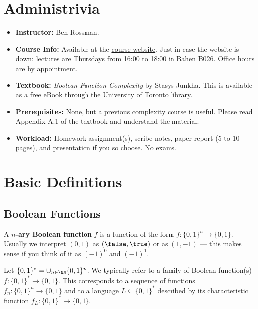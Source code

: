 
\section{Administrivia}
\label{sec:admin}
\begin{itemize}
	\item \textbf{Instructor:} Ben Rossman. 
	\item \textbf{Course Info:} Available at the \href{http://www.math.toronto.edu/rossman/CSC2429.html}{course website}. Just in case the website is down: lectures are Thursdays from 16:00 to 18:00 in Bahen B026. Office hours are by appointment.
	\item \textbf{Textbook:} \emph{Boolean Function Complexity} by Stasys Junkha. This is available as a free eBook through the University of Toronto library. 
	\item \textbf{Prerequisites:} None, but a previous complexity course is useful. Please read Appendix A.1 of the textbook and understand the material.
	\item \textbf{Workload:} Homework assignment(s), scribe notes, paper report (5 to 10 pages), and presentation if you so choose. No exams.
\end{itemize}

\section{Basic Definitions}
	\subsection{Boolean Functions}
	\label{section:definitions}
	\begin{definition}
		A \textbf{$n$-ary Boolean function} $f$ is a function of the form $f: \{0,1\}^n \rightarrow \{0,1\}$. Usually we interpret $(0,1)$ as $(\false, \true)$ or as $(1,-1)$ --- this makes sense if you think of it as $(-1)^0$ and $(-1)^{1}$.
	\end{definition}
	
	Let $\{0,1\}^* = \cup_{n \in \NN} \{0,1\}^n$. We typically refer to a family of Boolean function(s) $f: \{0,1\}^* \rightarrow \{0,1\}$. This corresponds to a sequence of functions $f_n: \{0,1\}^n \rightarrow \{0,1\}$ and to a language $L \subseteq \{0, 1\}^*$ described by its characteristic function $f_L: \{0,1\}^* \rightarrow \{0,1\}$.
	
